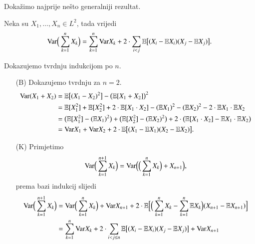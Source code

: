 \begin{rj}[\ref{zad:7.8}]
    Doka\v zimo najprije ne\v sto generalniji rezultat.

    Neka su $X_1, \ldots, X_n \in L^2$, tada vrijedi
    \begin{equation*}
        \mathrm{Var} \Big( \sum\limits_{k = 1}^{n} X_k \Big) = \sum\limits_{k = 1}^{n} \mathrm{Var} X_k + 2 \cdot \sum\limits_{i < j}^{} \mathbb{E} \big[ (X_i - \mathbb{E} X_i) (X_j - \mathbb{E} X_j) \big].
    \end{equation*}

    Dokazujemo tvrdnju indukcijom po $n$.
    \begin{enumerate}
        \item[(B)]
        Dokazujemo tvrdnju za $n = 2$.
        \begin{equation*}
            \begin{aligned}
                \mathrm{Var} (X_1 + X_2) &= \mathbb{E} \big[ (X_1 - X_2)^2 \big] - \big( \mathbb{E} [ X_1 + X_2 ] \big)^2\\
                &= \mathbb{E} [X_1^2] + \mathbb{E} [X_2^2] + 2 \cdot \mathbb{E} [X_1 \cdot X_2] - (\mathbb{E} X_1)^2 - (\mathbb{E} X_2)^2 - 2 \cdot \mathbb{E} X_1 \cdot \mathbb{E} X_2\\
                &= \big( \mathbb{E} [X_1^2] - (\mathbb{E} X_1)^2 \big) + \big( \mathbb{E} [ X_2^2 ] - (\mathbb{E} X_2)^2 \big) + 2 \cdot \big( \mathbb{E} [ X_1 \cdot X_2 ] - \mathbb{E} X_1 \cdot \mathbb{E} X_2 \big)\\
                &= \mathrm{Var} X_1 + \mathrm{Var} X_2 + 2 \cdot \mathbb{E} \big[ (X_1 - \mathbb{E} X_1) (X_2 - \mathbb{E} X_2) \big].
            \end{aligned}
        \end{equation*}
        \item[(K)]
        Primjetimo
        \begin{equation*}
            \mathrm{Var} \Big( \sum\limits_{k = 1}^{n + 1} X_k \Big) = \mathrm{Var} \Big( \Big( \sum\limits_{k = 1}^{n} X_k \Big) + X_{n + 1} \Big),
        \end{equation*}
        prema bazi indukcij slijedi
        \begin{equation*}
            \begin{aligned}
                \Var \Big( \suma{k = 1}{n + 1} X_k \Big) &= \Var \Big( \suma{k = 1}{n} X_k \Big) + \Var X_{n + 1} + 2 \cdot \masE \Big[ \Big(  \suma{k = 1}{n} X_k - \suma{k = 1}{n} \masE X_k \Big) (X_{n + 1} - \masE X_{n + 1}) \Big]\\
                &= \suma{k = 1}{n} \Var X_k + 2  \cdot \suma{i < j \leq n}{} \masE \big[ (X_i - \masE X_i) (X_j - \masE X_j) \big] + \Var X_{n + 1}\\

\end{aligned}
\end{equation*}
\end{enumerate}
\end{rj}
